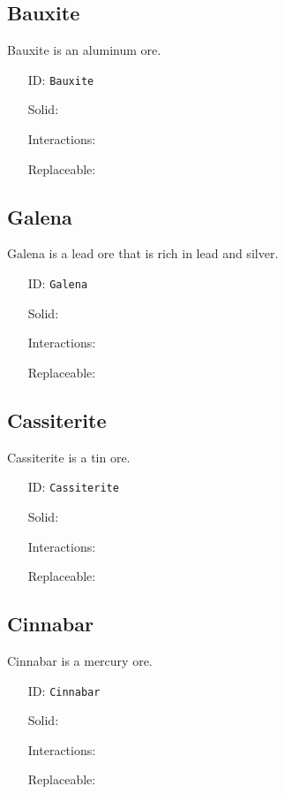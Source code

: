 \subsection{Bauxite}\label{subsec:blocks_bauxite}
Bauxite is an aluminum ore.
\newline
\begin{itemize}[nosep]
\item[ID:] \texttt{Bauxite}
\item[Solid:]  \Checkmark \item[Interactions:]  \XSolidBrush \item[Replaceable:]  \XSolidBrush \end{itemize}

\subsection{Galena}\label{subsec:blocks_galena}
Galena is a lead ore that is rich in lead and silver.
\newline
\begin{itemize}[nosep]
\item[ID:] \texttt{Galena}
\item[Solid:]  \Checkmark \item[Interactions:]  \XSolidBrush \item[Replaceable:]  \XSolidBrush \end{itemize}

\subsection{Cassiterite}\label{subsec:blocks_cassiterite}
Cassiterite is a tin ore.
\newline
\begin{itemize}[nosep]
\item[ID:] \texttt{Cassiterite}
\item[Solid:]  \Checkmark \item[Interactions:]  \XSolidBrush \item[Replaceable:]  \XSolidBrush \end{itemize}

\subsection{Cinnabar}\label{subsec:blocks_cinnabar}
Cinnabar is a mercury ore.
\newline
\begin{itemize}[nosep]
\item[ID:] \texttt{Cinnabar}
\item[Solid:]  \Checkmark \item[Interactions:]  \XSolidBrush \item[Replaceable:]  \XSolidBrush \end{itemize}

